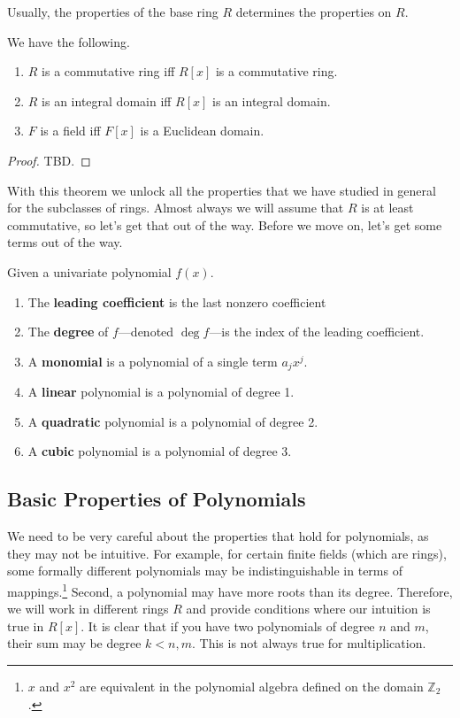  Usually, the properties of the base ring $R$ determines the properties on $R$. 

  \begin{lemma}
    We have the following. 
    \begin{enumerate}
      \item $R$ is a commutative ring iff $R[x]$ is a commutative ring. 
      \item $R$ is an integral domain iff $R[x]$ is an integral domain. 
      \item $F$ is a field iff $F[x]$ is a Euclidean domain.  
    \end{enumerate}
  \end{lemma}
  \begin{proof}
    TBD. 
  \end{proof} 

  With this theorem we unlock all the properties that we have studied in general for the subclasses of rings. Almost always we will assume that $R$ is at least commutative, so let's get that out of the way. Before we move on, let's get some terms out of the way. 

  \begin{definition}
    Given a univariate polynomial $f(x)$. 
    \begin{enumerate} 
      \item The \textbf{leading coefficient} is the last nonzero coefficient  
      \item The \textbf{degree} of $f$---denoted $\deg f$---is the index of the leading coefficient.
      \item A \textbf{monomial} is a polynomial of a single term $a_j x^j$. 
      \item A \textbf{linear} polynomial is a polynomial of degree 1. 
      \item A \textbf{quadratic} polynomial is a polynomial of degree 2. 
      \item A \textbf{cubic} polynomial is a polynomial of degree 3. 
    \end{enumerate}
  \end{definition}

\subsection{Basic Properties of Polynomials}

  We need to be very careful about the properties that hold for polynomials, as they may not be intuitive. For example, for certain finite fields (which are rings), some formally different polynomials may be indistinguishable in terms of mappings.\footnote{$x$ and $x^2$ are equivalent in the polynomial algebra defined on the domain $\mathbb{Z}_2$. } Second, a polynomial may have more roots than its degree. Therefore, we will work in different rings $R$ and provide conditions where our intuition is true in $R[x]$. It is clear that if you have two polynomials of degree $n$ and $m$, their sum may be degree $k < n, m$. This is not always true for multiplication. 

